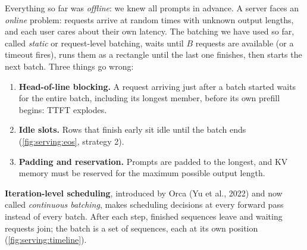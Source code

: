 Everything so far was \emph{offline}: we knew all prompts in advance. A server faces an \emph{online}
problem: requests arrive at random times with unknown output lengths, and each user cares about their
own latency. The batching we have used so far, called \emph{static} or request-level batching, waits
until $B$ requests are available (or a timeout fires), runs them as a rectangle until the last one
finishes, then starts the next batch. Three things go wrong:
\begin{enumerate}
  \item \textbf{Head-of-line blocking.} A request arriving just after a batch started waits for the
    entire batch, including its longest member, before its own prefill begins: TTFT explodes.
  \item \textbf{Idle slots.} Rows that finish early sit idle until the batch ends
    (\cref{fig:serving:eos}, strategy 2).
  \item \textbf{Padding and reservation.} Prompts are padded to the longest, and KV memory must be
    reserved for the maximum possible output length.
\end{enumerate}

\textbf{Iteration-level scheduling}, introduced by Orca (Yu et al., 2022) and now called
\emph{continuous batching}, makes scheduling decisions at every forward pass instead of every batch.
After each step, finished sequences leave and waiting requests join; the batch is a set of
sequences, each at its own position (\cref{fig:serving:timeline}).

